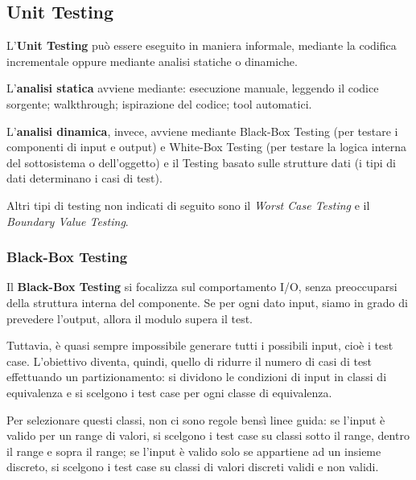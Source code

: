 \documentclass{article}
\begin{document}
    \subsection{Unit Testing}
    
            L'\textbf{Unit Testing} può essere eseguito in maniera informale, mediante la codifica incrementale oppure mediante analisi statiche o dinamiche. 
            
            L'\textbf{analisi statica} avviene mediante: esecuzione manuale, leggendo il codice sorgente; walkthrough; ispirazione del codice; tool automatici.
            
            L'\textbf{analisi dinamica}, invece, avviene mediante Black-Box Testing (per testare i componenti di input e output) e White-Box Testing (per testare la logica interna del sottosistema o dell'oggetto) e il Testing basato sulle strutture dati (i tipi di dati determinano i casi di test).
            
            \vspace{3mm}
            
            Altri tipi di testing non indicati di seguito sono il \textit{Worst Case Testing} e il \textit{Boundary Value Testing}.
        
        \subsubsection{Black-Box Testing}
        
            Il \textbf{Black-Box Testing} si focalizza sul comportamento I/O, senza preoccuparsi della struttura interna del componente. Se per ogni dato input, siamo in grado di prevedere l'output, allora il modulo supera il test. 
            
            Tuttavia, è quasi sempre impossibile generare tutti i possibili input, cioè i test case. L'obiettivo diventa, quindi, quello di ridurre il numero di casi di test effettuando un partizionamento: si dividono le condizioni di input in classi di equivalenza e si scelgono i test case per ogni classe di equivalenza.
            
            \vspace{3mm}
            
            Per selezionare questi classi, non ci sono regole bensì linee guida: se l'input è valido per un range di valori, si scelgono i test case su classi sotto il range, dentro il range e sopra il range; se l'input è valido solo se appartiene ad un insieme discreto, si scelgono i test case su classi di valori discreti validi e non validi.
            
\end{document}
